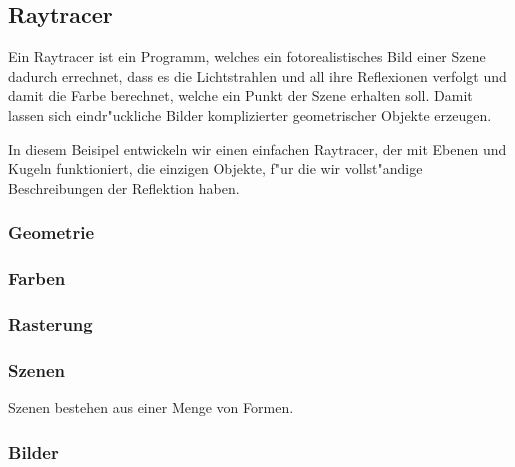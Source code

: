 %
%
\subsection{Raytracer}
Ein Raytracer ist ein Programm, welches ein fotorealistisches Bild
einer Szene dadurch errechnet, dass es die Lichtstrahlen und all ihre
Reflexionen verfolgt und damit die Farbe berechnet, welche ein Punkt
der Szene erhalten soll.
Damit lassen sich eindr"uckliche Bilder komplizierter
geometrischer Objekte erzeugen.

In diesem Beisipel entwickeln wir einen einfachen Raytracer, der mit
Ebenen und Kugeln funktioniert, die einzigen Objekte, f"ur die wir
vollst"andige Beschreibungen der Reflektion haben.

\subsubsection{Geometrie}


\subsubsection{Farben}

\subsubsection{Rasterung}

\subsubsection{Szenen}
Szenen bestehen aus einer Menge von Formen.

\subsubsection{Bilder}
